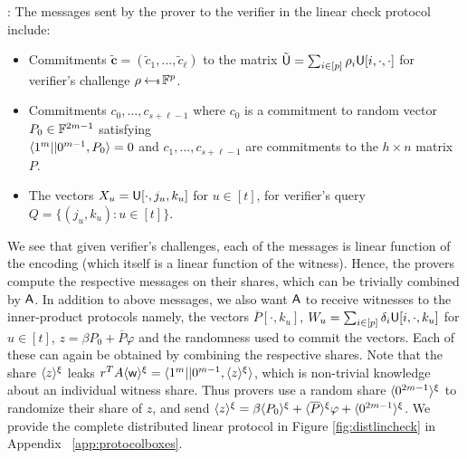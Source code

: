 : The messages sent by the prover to the
verifier in the linear check protocol include:
\begin{itemize}
\item Commitments $\tilde{\bm{c}} = (\tilde{c}_1,\ldots,\tilde{c}_\ell)$ to the matrix $\tilde{\mathsf{U}}=
\sum_{i\in [p]}\rho_i\mathsf{U}[i,\cdot,\cdot]$ for verifier's challenge $\rho\hskip2.3pt{\gets\!\!\mbox{\tiny${\$}$\normalsize}}\,
\mathbb{F}^p$.
\item Commitments $c_0,\ldots,c_{s+\ell-1}$ where $c_0$ is a commitment to random
vector $P_0\in \mathbb{F}^{2m-1}$ satisfying\\ $\langle 1^m||0^{m-1},P_0\rangle=0$ and
$c_1,\ldots,c_{s+\ell-1}$ are commitments to the $h\times n$ matrix $P$.
\item The vectors $X_u=\mathsf{U}[\cdot,j_u,k_u]$ for $u\in [t]$, for verifier's
query $Q=\{(j_u,k_u):u\in [t]\}$.
\end{itemize}
We see that given verifier's challenges, each of the messages is linear function
of the encoding (which itself is a linear function of the witness). Hence, the
provers compute the respective messages on their shares, which can be trivially
combined by $\mathsf{A}$. In addition to above messages, we also want $\mathsf{A}$ to receive
witnesses to the inner-product protocols namely, the vectors
$\overline{P}[\cdot,k_u]$, $W_u=\sum_{i\in [p]}\delta_i\mathsf{U}[i,\cdot,k_u]$ for
$u\in [t]$, $z=\beta P_0+\overline{P}\varphi$ and the randomness used to commit
the vectors. Each of these can again be obtained by combining the respective shares.
Note that the share $\langle{z}\rangle^\xi$ leaks $r^TA\langle{\mathsf{w}}\rangle^\xi=\langle 1^m||0^{m-1},\langle{z}\rangle^\xi\rangle$, which
is non-trivial knowledge about an individual witness share. Thus provers use a
random share $\langle{0^{2m-1}}\rangle^\xi$ to randomize their share of $z$, and send
$\langle{z}\rangle^\xi=\beta\langle{P_0}\rangle^\xi+\langle{\overline{P}}\rangle^\xi\varphi+\langle{0^{2m-1}}\rangle^\xi$. 
We provide the complete distributed linear protocol in Figure
\ref{fig:distlincheck} in Appendix ~\ref{app:protocolboxes}.  

